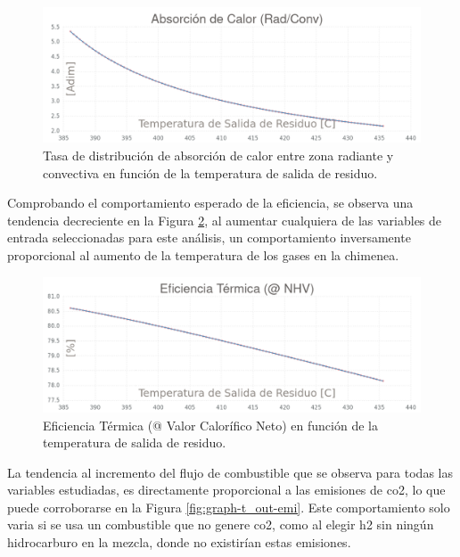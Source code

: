 \begin{figure}[hbt]
\begin{center}
\includegraphics[scale=0.38]{images/graph-t_out-dist}
\caption[Distribución de absorción de calor vs Temperatura de salida de residuo]{Tasa de distribución de absorción de calor entre zona radiante y convectiva en función de la temperatura de salida de residuo.}
\label{fig:graph-t_out-dist}
\end{center}
\end{figure}

\par Comprobando el comportamiento esperado de la eficiencia, se observa una tendencia decreciente en la Figura \ref{fig:graph-t_out-efic}, al aumentar cualquiera de las variables de entrada seleccionadas para este análisis, un comportamiento inversamente proporcional al aumento de la temperatura de los gases en la chimenea.

\begin{figure}[hbt]
\begin{center}
\includegraphics[scale=0.38]{images/graph-t_out-efic}
\caption[Eficiencia Térmica vs Temperatura de salida de residuo]{Eficiencia Térmica (@ Valor Calorífico Neto) en función de la temperatura de salida de residuo.}
\label{fig:graph-t_out-efic}
\end{center}
\end{figure}

\par La tendencia al incremento del flujo de combustible que se observa para todas las variables estudiadas, es directamente proporcional a las emisiones de \ac{co2}, lo que puede corroborarse en la Figura \ref{fig:graph-t_out-emi}. Este comportamiento solo varia si se usa un combustible que no genere \ac{co2}, como al elegir \ac{h2} sin ningún hidrocarburo en la mezcla, donde no existirían estas emisiones.

